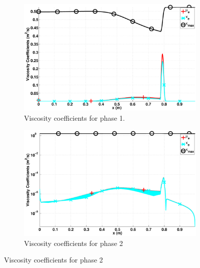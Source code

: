 \documentclass[preprint,10pt]{elsarticle}
\begin{document}
\begin{figure}[H]
        \centering
        \begin{subfigure}[b]{0.495\textwidth}
                \centering
                \includegraphics[width=\textwidth]{figures/nozzle-aint-1e4_liquid_viscosity_kappa_mu.eps}
                \caption{Viscosity coefficients for phase 1.}
                \label{fig:nozzle-aint-1e4-visc-coeff-phase-1}
        \end{subfigure}%
        \begin{subfigure}[b]{0.495\textwidth}
                \centering
                \includegraphics[width=\textwidth]{figures/nozzle-aint-1e4_vapor_viscosity_kappa_mu.eps}
                \caption{Viscosity coefficients for phase 2}
                \label{fig:nozzle-aint-1e4-visc-coeff-phase-2}
        \end{subfigure}
        

\end{figure}
\end{document}
